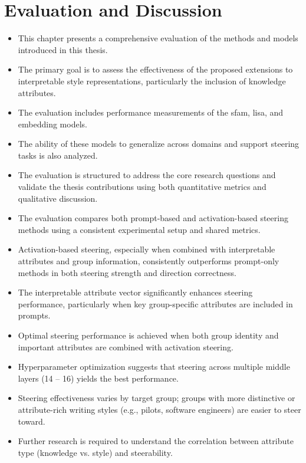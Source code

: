 \chapter{Evaluation and Discussion}%
\label{sec:evaluation}
\begin{itemize}
  \item This chapter presents a comprehensive evaluation of the methods and models introduced in this thesis.
  \item The primary goal is to assess the effectiveness of the proposed extensions to interpretable style representations, particularly the inclusion of knowledge attributes.
  \item The evaluation includes performance measurements of the \ac{sfam}, \ac{lisa}, and embedding models.
  \item The ability of these models to generalize across domains and support steering tasks is also analyzed.
  \item The evaluation is structured to address the core research questions and validate the thesis contributions using both quantitative metrics and qualitative discussion.
  \item The evaluation compares both prompt-based and activation-based steering methods using a consistent experimental setup and shared metrics.
  \item Activation-based steering, especially when combined with interpretable attributes and group information, consistently outperforms prompt-only methods in both steering strength and direction correctness.
  \item The interpretable attribute vector significantly enhances steering performance, particularly when key group-specific attributes are included in prompts.
  \item Optimal steering performance is achieved when both group identity and important attributes are combined with activation steering.
  \item Hyperparameter optimization suggests that steering across multiple middle layers (\num{14} -- \num{16}) yields the best performance.
  \item Steering effectiveness varies by target group; groups with more distinctive or attribute-rich writing styles (e.g., pilots, software engineers) are easier to steer toward.
  \item Further research is required to understand the correlation between attribute type (knowledge vs. style) and steerability.
\end{itemize}

